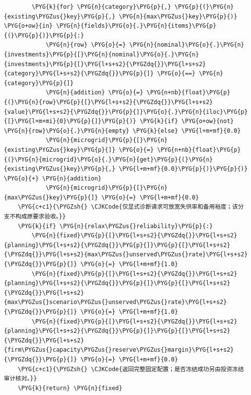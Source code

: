 \begin{Verbatim}
        \PYG{k}{for} \PYG{n}{category}\PYG{p}{,} \PYG{p}{(}\PYG{n}{existing\PYGZus{}key}\PYG{p}{,} \PYG{n}{max\PYGZus{}key}\PYG{p}{)} \PYG{o+ow}{in} \PYG{n}{fields}\PYG{o}{.}\PYG{n}{items}\PYG{p}{(}\PYG{p}{)}\PYG{p}{:}
            \PYG{n}{row} \PYG{o}{=} \PYG{n}{nominal}\PYG{o}{.}\PYG{n}{investments}\PYG{p}{[}\PYG{n}{nominal}\PYG{o}{.}\PYG{n}{investments}\PYG{p}{[}\PYG{l+s+s2}{\PYGZdq{}}\PYG{l+s+s2}{category}\PYG{l+s+s2}{\PYGZdq{}}\PYG{p}{]} \PYG{o}{==} \PYG{n}{category}\PYG{p}{]}
            \PYG{n}{addition} \PYG{o}{=} \PYG{n+nb}{float}\PYG{p}{(}\PYG{n}{row}\PYG{p}{[}\PYG{l+s+s2}{\PYGZdq{}}\PYG{l+s+s2}{value}\PYG{l+s+s2}{\PYGZdq{}}\PYG{p}{]}\PYG{o}{.}\PYG{n}{iloc}\PYG{p}{[}\PYG{l+m+mi}{0}\PYG{p}{]}\PYG{p}{)} \PYG{k}{if} \PYG{o+ow}{not} \PYG{n}{row}\PYG{o}{.}\PYG{n}{empty} \PYG{k}{else} \PYG{l+m+mf}{0.0}
            \PYG{n}{microgrid}\PYG{p}{[}\PYG{n}{existing\PYGZus{}key}\PYG{p}{]} \PYG{o}{=} \PYG{n+nb}{float}\PYG{p}{(}\PYG{n}{microgrid}\PYG{o}{.}\PYG{n}{get}\PYG{p}{(}\PYG{n}{existing\PYGZus{}key}\PYG{p}{,} \PYG{l+m+mf}{0.0}\PYG{p}{)}\PYG{p}{)} \PYG{o}{+} \PYG{n}{addition}
            \PYG{n}{microgrid}\PYG{p}{[}\PYG{n}{max\PYGZus{}key}\PYG{p}{]} \PYG{o}{=} \PYG{l+m+mf}{0.0}
    \PYG{c+c1}{\PYGZsh{} \CJKCode{仅显式诊断请求可放宽失供率和备用裕度；该分支不构成原要求验收。}}
    \PYG{k}{if} \PYG{n}{relax\PYGZus{}reliability}\PYG{p}{:}
        \PYG{n}{fixed}\PYG{p}{[}\PYG{l+s+s2}{\PYGZdq{}}\PYG{l+s+s2}{planning}\PYG{l+s+s2}{\PYGZdq{}}\PYG{p}{]}\PYG{p}{[}\PYG{l+s+s2}{\PYGZdq{}}\PYG{l+s+s2}{max\PYGZus{}unserved\PYGZus{}rate}\PYG{l+s+s2}{\PYGZdq{}}\PYG{p}{]} \PYG{o}{=} \PYG{l+m+mf}{1.0}
        \PYG{n}{fixed}\PYG{p}{[}\PYG{l+s+s2}{\PYGZdq{}}\PYG{l+s+s2}{planning}\PYG{l+s+s2}{\PYGZdq{}}\PYG{p}{]}\PYG{p}{[}\PYG{l+s+s2}{\PYGZdq{}}\PYG{l+s+s2}{max\PYGZus{}scenario\PYGZus{}unserved\PYGZus{}rate}\PYG{l+s+s2}{\PYGZdq{}}\PYG{p}{]} \PYG{o}{=} \PYG{l+m+mf}{1.0}
        \PYG{n}{fixed}\PYG{p}{[}\PYG{l+s+s2}{\PYGZdq{}}\PYG{l+s+s2}{planning}\PYG{l+s+s2}{\PYGZdq{}}\PYG{p}{]}\PYG{p}{[}\PYG{l+s+s2}{\PYGZdq{}}\PYG{l+s+s2}{firm\PYGZus{}capacity\PYGZus{}reserve\PYGZus{}margin}\PYG{l+s+s2}{\PYGZdq{}}\PYG{p}{]} \PYG{o}{=} \PYG{l+m+mf}{0.0}
    \PYG{c+c1}{\PYGZsh{} \CJKCode{返回完整固定配置；是否冻结成功另由投资冻结审计核对。}}
    \PYG{k}{return} \PYG{n}{fixed}
\end{Verbatim}
